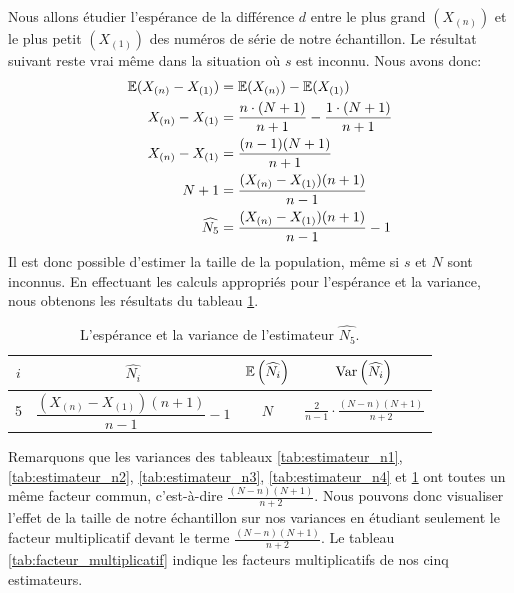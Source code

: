 \documentclass[10pt]{article}
\begin{document}
Nous allons étudier l'espérance de la différence \(d\) entre le plus
grand \((X_{(n)})\) et le plus petit \((X_{(1)})\) des numéros de série
de notre échantillon. Le résultat suivant reste vrai même dans la
situation où \(s\) est inconnu. Nous avons donc: \begin{align*}
\operatorname{\mathbb{E}}(X_{(n)}-X_{(1)}) &= \operatorname{\mathbb{E}}(X_{(n)})-\operatorname{\mathbb{E}}(X_{(1)}) \\
X_{(n)}-X_{(1)} &= \dfrac{n\cdot(N+1)}{n+1}-\dfrac{1\cdot(N+1)}{n+1} \\
X_{(n)}-X_{(1)} &= \dfrac{(n-1)(N+1)}{n+1} \\
N+1 &= \dfrac{(X_{(n)}-X_{(1)})(n+1)}{n-1} \\
\widehat{N_5} &= \dfrac{(X_{(n)}-X_{(1)})(n+1)}{n-1}-1
\end{align*} Il est donc possible d'estimer la taille de la population,
même si \(s\) et \(N\) sont inconnus. En effectuant les calculs
appropriés pour l'espérance et la variance, nous obtenons les résultats
du tableau \ref{tab:estimateur_n5}.

\begin{table}[ht]
\begin{center}
\begin{tabular}{cccc}
\toprule
$i$ & $\widehat{N_i}$ & $\operatorname{\mathbb{E}}\left(\widehat{N_i}\right)$ & $\operatorname{Var}\left(\widehat{N_i}\right)$ \\
\midrule
5 & $\dfrac{(X_{(n)}-X_{(1)})(n+1)}{n-1}-1$ & $N$ & $\frac{2}{n-1}\cdot\frac{(N-n)(N+1)}{n+2}$ \\
\bottomrule
\end{tabular}
\end{center}
\caption{\label{tab:estimateur_n5} {L'espérance et la variance de l'estimateur $\widehat{N_5}$.} }
\end{table}

Remarquons que les variances des tableaux \ref{tab:estimateur_n1},
\ref{tab:estimateur_n2}, \ref{tab:estimateur_n3},
\ref{tab:estimateur_n4} et \ref{tab:estimateur_n5} ont toutes un même
facteur commun, c'est-à-dire \(\frac{(N-n)(N+1)}{n+2}\). Nous pouvons
donc visualiser l'effet de la taille de notre échantillon sur nos
variances en étudiant seulement le facteur multiplicatif devant le terme
\(\frac{(N-n)(N+1)}{n+2}\). Le tableau \ref{tab:facteur_multiplicatif}
indique les facteurs multiplicatifs de nos cinq estimateurs.
\end{document}
